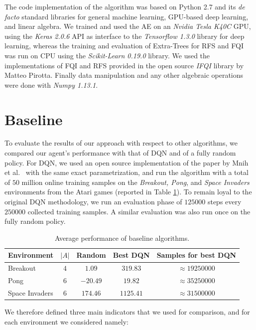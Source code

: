The code implementation of the algorithm was based on Python 2.7 and its 
\textit{de facto} standard libraries for general machine learning, GPU-based 
deep learning, and linear algebra. 
We trained and used the AE on an \textit{Nvidia Tesla K40C} GPU, using the 
\textit{Keras 2.0.6} API as interface to the \textit{Tensorflow 1.3.0} library 
for deep learning, whereas the training and evaluation of Extra-Trees 
for RFS and FQI was run on CPU using the \textit{Scikit-Learn 0.19.0} library.
We used the implementations of FQI and RFS provided in the open source 
\textit{IFQI} library by Matteo Pirotta.
Finally data manipulation and any other algebraic operations were done with 
\textit{Numpy 1.13.1}.

\section{Baseline}\label{s:exp_baseline}
To evaluate the results of our approach with respect to other algorithms, we 
compared our agent's performance with that of DQN and of a fully random policy. 
For DQN, we used an open source implementation of the paper by Mnih et al.\ \cite{mnih2015human} 
with the same exact parametrization, and run the algorithm with a total of $50$ 
million online training samples on the \textit{Breakout, Pong}, and 
\textit{Space Invaders} environments from the Atari games (reported in Table \ref{t:envs_used}).
To remain loyal to the original DQN methodology, we run an evaluation phase 
of $125000$ steps every $250000$ collected training samples. A similar 
evaluation was also run once on the fully random policy.
%
\begin{table}
    \centering
    \begin{tabular}{l c c c c} 
	\hline
	Environment    & $|A|$ & Random   & Best DQN  & Samples for best DQN \\ 
	\hline 
	Breakout       & $4$   & $1.09$   & $319.83$  & $\approx19250000$ \\
	Pong           & $6$   & $-20.49$ & $19.82$   & $\approx35250000$ \\
	Space Invaders & $6$   & $174.46$ & $1125.41$ & $\approx31500000$ \\
	\hline
    \end{tabular}
    \caption[Performance of baseline algorithms]{Average performance of baseline
	     algorithms.}
    \label{t:envs_used}
\end{table}
%
We therefore defined three main indicators that we used for comparison, and for 
each environment we considered namely:

